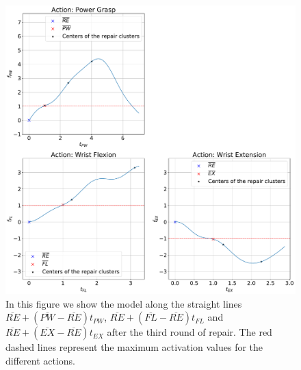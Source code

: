 \begin{figure}[H]
    \centering
    \includegraphics[width=\textwidth]{Images/repair-example/SMT-State3.pdf}
    \caption{In this figure we show the model along the straight lines $\overline{RE} + (\overline{PW} - \overline{RE})t_{PW}$, $\overline{RE} + (\overline{FL} - \overline{RE})t_{FL}$ and $\overline{RE} + (\overline{EX} - \overline{RE})t_{EX}$ after the third round of repair. The red dashed lines represent the maximum activation values for the different actions.}
    \label{fig:SMT-exec-3}
\end{figure}
